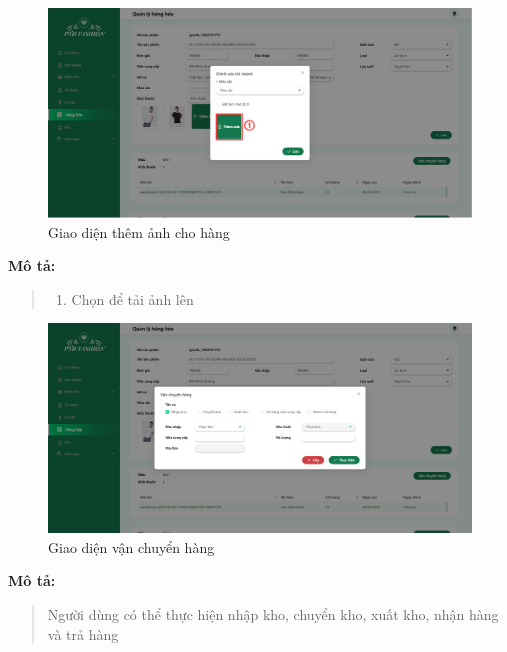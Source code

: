\begin{figure}[!htp]
    \centering
    \includegraphics[width=12cm]{img/UI/admin_implement/goodsImage.png}
    \newline
    \caption{Giao diện thêm ảnh cho hàng}
\end{figure}
\textbf{Mô tả:}
\begin{quote}
    \begin{enumerate}
        \item Chọn để tải ảnh lên
    \end{enumerate}
\end{quote}

\begin{figure}[!htp]
    \centering
    \includegraphics[width=12cm]{img/UI/admin_implement/goodsTransfer.png}
    \newline
    \caption{Giao diện vận chuyển hàng}
\end{figure}
\textbf{Mô tả:}
\begin{quote}
    Người dùng có thể thực hiện nhập kho, chuyển kho, xuất kho, nhận hàng và trả hàng
\end{quote}

\newpage

